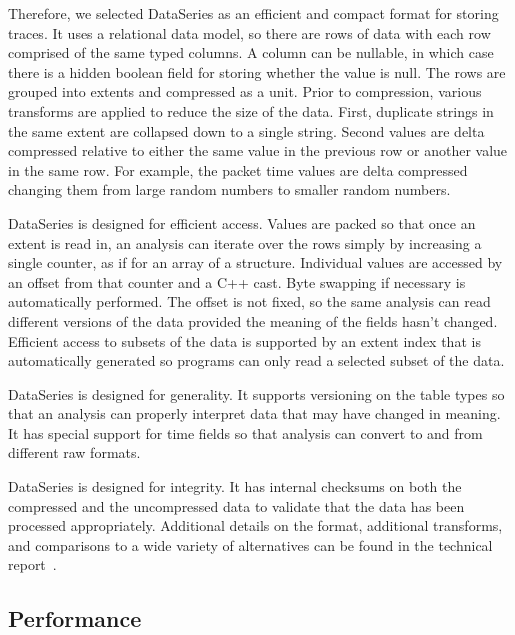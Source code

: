 Therefore, we selected DataSeries as an efficient and compact format
for storing traces.  It uses a relational data model, so
there are rows of data with each row comprised of the same typed
columns.  A column can be nullable, in which case there is a hidden
boolean field for storing whether the value is null.  The rows are
grouped into extents and compressed as a unit.  Prior to compression,
various transforms are applied to reduce the size of the data.  First,
duplicate strings in the same extent are collapsed down to a single
string.  Second values are delta compressed relative to either the
same value in the previous row or another value in the same row.  For
example, the packet time values are delta compressed changing them
from large random numbers to smaller random numbers.

DataSeries is designed for efficient access. Values are packed so that
once an extent is read in, an analysis can iterate over the rows
simply by increasing a single counter, as if for an array of a
structure.  Individual values are accessed by an offset from that
counter and a C++ cast.  Byte swapping if necessary is automatically
performed.  The offset is not fixed, so the same analysis can read
different versions of the data provided the meaning of the fields
hasn't changed.  Efficient access to subsets of the data is supported
by an extent index that is automatically generated so programs can
only read a selected subset of the data.

DataSeries is designed for generality. It supports versioning on the
table types so that an analysis can properly interpret data that may
have changed in meaning.  It has special support for time fields so
that analysis can convert to and from different raw formats.

DataSeries is designed for integrity.  It has internal checksums on
both the compressed and the uncompressed data to validate that the
data has been processed appropriately.  Additional details on the
format, additional transforms, and comparisons to a wide variety of
alternatives can be found in the technical
report~\cite{DSTechnicalReportSnapshot}.

\subsection{Performance}

